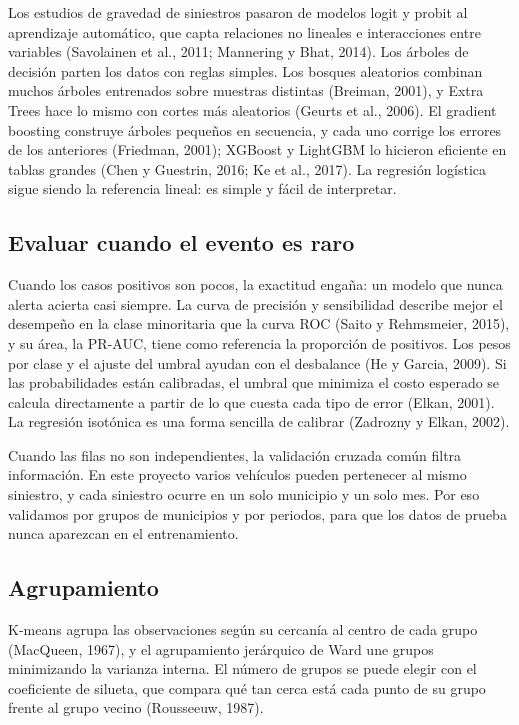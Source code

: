 \documentclass[11pt,a4paper]{article}
\begin{document}
Los estudios de gravedad de siniestros pasaron de modelos logit y probit al aprendizaje automático, que capta relaciones no lineales e interacciones entre variables (Savolainen et al., 2011; Mannering y Bhat, 2014). Los árboles de decisión parten los datos con reglas simples. Los bosques aleatorios combinan muchos árboles entrenados sobre muestras distintas (Breiman, 2001), y Extra Trees hace lo mismo con cortes más aleatorios (Geurts et al., 2006). El gradient boosting construye árboles pequeños en secuencia, y cada uno corrige los errores de los anteriores (Friedman, 2001); XGBoost y LightGBM lo hicieron eficiente en tablas grandes (Chen y Guestrin, 2016; Ke et al., 2017). La regresión logística sigue siendo la referencia lineal: es simple y fácil de interpretar.

\subsection{Evaluar cuando el evento es raro}

Cuando los casos positivos son pocos, la exactitud engaña: un modelo que nunca alerta acierta casi siempre. La curva de precisión y sensibilidad describe mejor el desempeño en la clase minoritaria que la curva ROC (Saito y Rehmsmeier, 2015), y su área, la PR-AUC, tiene como referencia la proporción de positivos. Los pesos por clase y el ajuste del umbral ayudan con el desbalance (He y Garcia, 2009). Si las probabilidades están calibradas, el umbral que minimiza el costo esperado se calcula directamente a partir de lo que cuesta cada tipo de error (Elkan, 2001). La regresión isotónica es una forma sencilla de calibrar (Zadrozny y Elkan, 2002).

Cuando las filas no son independientes, la validación cruzada común filtra información. En este proyecto varios vehículos pueden pertenecer al mismo siniestro, y cada siniestro ocurre en un solo municipio y un solo mes. Por eso validamos por grupos de municipios y por periodos, para que los datos de prueba nunca aparezcan en el entrenamiento.

\subsection{Agrupamiento}

K-means agrupa las observaciones según su cercanía al centro de cada grupo (MacQueen, 1967), y el agrupamiento jerárquico de Ward une grupos minimizando la varianza interna. El número de grupos se puede elegir con el coeficiente de silueta, que compara qué tan cerca está cada punto de su grupo frente al grupo vecino (Rousseeuw, 1987).
\end{document}
